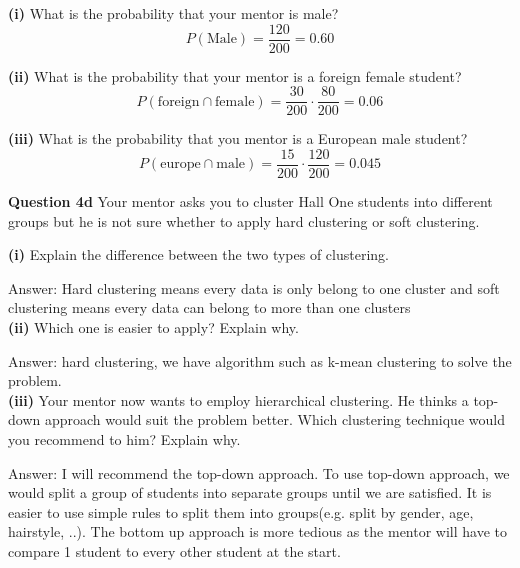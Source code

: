 \documentclass[11pt,a4paper]{report}
\begin{document}
\begin{multicols*}{2}
\noindent \textbf{(i)} What is the probability that your mentor is male?
$$P(\text{Male}) = \frac{120}{200} = 0.60$$

\noindent \textbf{(ii)} What is the probability that your mentor is a foreign female student?
$$P(\text{foreign} \cap \text{female}) = \frac{30}{200}\cdot \frac{80}{200}=0.06$$

\noindent \textbf{(iii)} What is the probability that you mentor is a European male student?
$$P(\text{europe} \cap \text{male}) = \frac{15}{200}\cdot \frac{120}{200}=0.045$$

\noindent \textbf{Question 4d} Your mentor asks you to cluster Hall One students into different groups but he is not sure whether to apply hard clustering or soft clustering.

\noindent \textbf{(i)} Explain the difference between the two types of clustering.

\noindent Answer: Hard clustering means every data is only belong to one cluster and soft clustering means every data can belong to more than one clusters\\

\noindent \textbf{(ii)} Which one is easier to apply? Explain why.

\noindent Answer: hard clustering, we have algorithm such as k-mean clustering to solve the problem.\\

\noindent \textbf{(iii)} Your mentor now wants to employ hierarchical clustering. He thinks a top-down approach would suit the problem better. Which clustering technique would you recommend to him? Explain why. 

\noindent Answer: I will recommend the top-down approach. To use top-down approach, we would split a group of students into separate groups until we are satisfied. It is easier to use simple rules to split them into groups(e.g. split by gender, age, hairstyle, ..). The bottom up approach is more tedious as the mentor will have to compare 1 student to every other student at the start.  

\end{multicols*}
\end{document}
